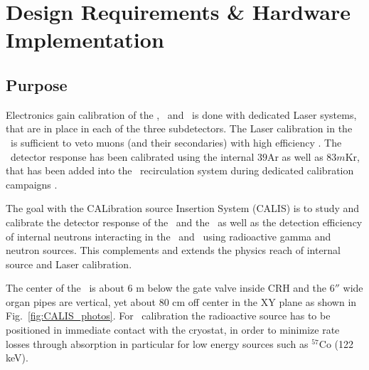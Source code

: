 \section{Design Requirements \& Hardware Implementation} \label{sec:hardware}\label{sec:design_requirements}

\subsection{Purpose}
Electronics gain calibration of the \wcd, \lsv\ and \tpc\ is done with dedicated Laser systems, that are in place in each of the three subdetectors. The Laser calibration in the \wcd\ is sufficient to veto muons (and their secondaries) with high efficiency \cite{veto_paper}. The \tpc\ detector response has been calibrated using the internal ${39}$Ar as well as $83m$Kr, that has been added into the \lar\ recirculation system during dedicated calibration campaigns \cite{DS:firstpaper}.

The goal with the CALibration source Insertion System (CALIS) is to study and calibrate the detector response of the \tpc\ and the \lsv\ as well as the detection efficiency of internal neutrons interacting in the \tpc\ and \lsv\ using radioactive gamma and neutron sources. This complements and extends the physics reach of internal source and Laser calibration. 

The center of the \lsv\ is about 6 m below the gate valve inside CRH
 and the $6''$ wide organ pipes are vertical, yet about 80 cm off center in the XY plane as shown in Fig.~\ref{fig:CALIS_photos}. For \tpc\ calibration the radioactive source has to be positioned in immediate contact with the cryostat, in order to minimize rate losses through absorption in particular for low energy sources such as $^{57}$Co (122 keV). 

